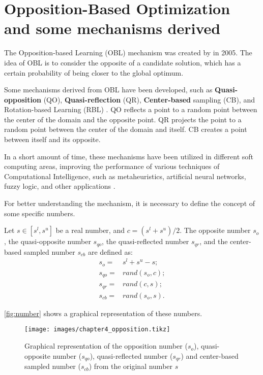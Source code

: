 \section{Opposition-Based Optimization and some mechanisms derived}
\label{sec:obl}

The Opposition-based Learning (OBL) mechanism was created by  in 2005. The idea of OBL is to consider the opposite of a candidate solution, which has a certain probability of being closer to the global optimum.

Some mechanisms derived from OBL have been developed, such as \textbf{Quasi-opposition} (QO), \textbf{Quasi-reflection} (QR), \textbf{Center-based} sampling (CB), and Rotation-based Learning (RBL) \cite{ergezer2009oppositional,rahnamayan2007quasi,tizhoosh2008oppositional}. QO reflects a point to a random point between the center of the domain and the opposite point. QR projects the point to a random point between the center of the domain and itself. CB creates a point between itself and its opposite.

In a short amount of time, these mechanisms have been utilized in different soft computing areas, improving the performance of various techniques of Computational Intelligence, such as metaheuristics, artificial neural networks, fuzzy logic, and other applications \cite{xu2014review}.

For better understanding the mechanism, it is necessary to define the concept of some specific numbers.

\begin{definition}
Let $s \in \left[s^l, s^u\right]$ be a real number, and $c = (s^l + s^u) / 2$. The opposite number $s_o$, the quasi-opposite number $s_{qo}$, the quasi-reflected number $s_{qr}$, and the center-based sampled number $s_{cb}$ are defined as:
%
\begin{align}
s_o =& s^l + s^u - s;\\
s_{qo} =& rand(s_o,c);\\
s_{qr} =& rand(c,s);\\
s_{cb} =& rand(s_o,s).
\end{align}

\end{definition}

\autoref{fig:number} shows a graphical representation of these numbers.

\begin{figure}[H]
\caption{Graphical representation of the opposition number ($s_o$), quasi-opposite number ($s_{qo}$), quasi-reflected number ($s_{qr}$) and center-based sampled number ($s_{cb}$) from the original number $s$}
\label{fig:number}
\centering
\vspace{1em}
\texttt{[image: images/chapter4\_opposition.tikz]}
\end{figure}


